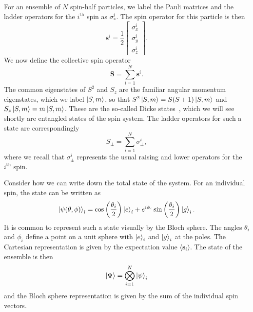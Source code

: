 For an ensemble of $N$ spin-half particles, we label the Pauli matrices and the
ladder operators for the $i^\text{th}$ spin as $\sigma_*^i$. The spin operator
for this particle is then
%
\begin{equation}
  \mathbf{s}^i = \frac{1}{2}\begin{bmatrix} \sigma^i_x \\ \sigma^i_y \\ \sigma^i_z
\end{bmatrix}.
\end{equation}
%
We now define the collective spin operator
%
\begin{equation}
  \mathbf{S} = \sum_{i=1}^N \mathbf{s}^i.
\end{equation}
%
The common eigenstates of $S^2$ and $S_z$ are the familiar angular
momentum eigenstates, which we label $\ket{S,m}$, so that $S^2 \ket{S,m} =
S(S+1)\ket{S, m}$ and $S_z \ket{S,m} = m\ket{S, m}$. These are the so-called
Dicke states~\cite{PhysRev.93.99}, which we will see shortly are entangled
states of the spin system. The ladder operators for such a state are
correspondingly~\cite{Binney}
%
\begin{equation}
  S_\pm = \sum_{i=1}^N \sigma_\pm^i,
\end{equation}
%
where we recall that $\sigma_\pm^i$ represents the usual raising and lower
operators for the $i^\text{th}$ spin.

Consider how we can write down the total state of the system. For an individual
spin, the state can be written as
%
\begin{equation}
  \ket{\psi(\theta, \phi)}_i = \cos\left(\frac{\theta_i}{2}\right)\ket{e}_i +
  e^{i\phi_i}\sin\left(\frac{\theta_i}{2}\right)\ket{g}_i.
  \label{eqn:blochspin}
\end{equation}
%
It is common to represent such a state visually by the Bloch sphere.
The angles $\theta_i$ and $\phi_i$ define a point on a unit sphere
with $\ket{e}_i$ and $\ket{g}_i$ at the poles. The Cartesian
representation is given by the expectation value $\langle \mathbf{s}_i
\rangle$.
%
The state of the ensemble is then
%
\begin{equation}
  \ket{\Psi} = \bigotimes_{i=1}^N \ket{\psi}_i
\end{equation}
%
and the Bloch sphere representation is given by the sum of the individual spin
vectors.



